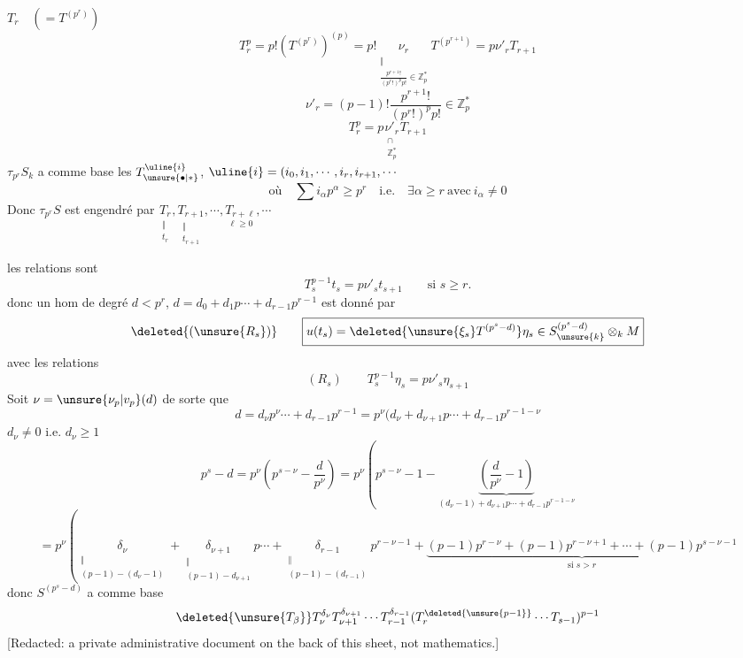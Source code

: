 $T_r\quad(=T^{(p^r)})$
\[
T_r^p=p!(T^{(p^r)})^{(p)}=p!\underset{\substack{\Vert\\\frac{p^{r+1}!}{(p^r!)^p p!}\in\mathbb Z_p^*}}{\nu_r}T^{(p^{r+1})}=p\nu'_rT_{r+1}
\]
\[
\nu'_r=(p-1)!\frac{p^{r+1}!}{(p^r!)^p p!}\in\mathbb Z_p^*
\]
\[
\boxed{T_r^p=p\underset{\substack{\cap\\\mathbb Z_p^*}}{\nu'_r}T_{r+1}}
\]
$\tau_{p^r}S_k$ a comme base les $T_{\unsure{\bullet|*}}^{\uline{i}}$, $\uline{i}=(i_0,i_1,\cdots,i_r,i_{r+1},\cdots$
\[
\text{où}\quad\sum i_\alpha p^\alpha\geq p^r\quad\text{i.e.}\quad\exists\alpha\geq r\ \text{avec}\ i_\alpha\ne0
\]
Donc $\tau_{p^r}S$ est engendré par $\underset{\substack{\Vert\\t_r}}{T_r},\underset{\substack{\Vert\\t_{r+1}}}{T_{r+1}},\cdots,\underset{\ell\geq0}{T_{r+\ell}},\cdots$

les relations sont
\[
\boxed{T_s^{p-1}t_s=p\nu'_s t_{s+1}\qquad\text{si }s\geq r}.
\]
donc un hom de degré $d<p^r$, $d=d_0+d_1p\cdots+d_{r-1}p^{r-1}$
est donné par 
\[
\deleted{(\unsure{R_s})}\qquad\boxed{u(t_s)=\deleted{\unsure{\xi_s}T^{(p^s-d)}}\eta_s\in S_{\unsure{k}}^{(p^s-d)}\otimes_k M}
\]
avec les relations
\[
(R_s)\qquad\boxed{T_s^{p-1}\eta_s=p\nu'_s\eta_{s+1}}
\]
Soit $\nu=\unsure{\nu_p|v_p}(d)$ de sorte que
\[
d=d_\nu p^\nu\cdots+d_{r-1}p^{r-1}=p^\nu(d_\nu+d_{\nu+1}p\cdots+d_{r-1}p^{r-1-\nu}
\]
$d_\nu\ne0$ i.e. $d_\nu\geq1$
\[
p^s-d=p^\nu\left(p^{s-\nu}-\frac d{p^\nu}\right)=p^\nu\left(p^{s-\nu}-1-\underbrace{\left(\frac d{p^\nu}-1\right)}_{(d_\nu-1)+d_{\nu+1}p\cdots+d_{r-1}p^{r-1-\nu}}\right.
\]
\[
=p^\nu\left(\underset{\substack{\Vert\\(p-1)-(d_\nu-1)}}{\delta_\nu}+\underset{\substack{\Vert\\(p-1)-d_{\nu+1}}}{\delta_{\nu+1}}p\cdots+\underset{\substack{\Vert\\(p-1)-(d_{r-1})}}{\delta_{r-1}}p^{r-\nu-1}+\underbrace{(p-1)p^{r-\nu}+(p-1)p^{r-\nu+1}+\cdots+(p-1)p^{s-\nu-1}}_{\text{si }s>r}\right.
\]
donc $S^{(p^s-d)}$ a comme base
\[
\deleted{\unsure{T_\beta}}T_\nu^{\delta_\nu}T_{\nu+1}^{\delta_{\nu+1}}\cdots T_{r-1}^{\delta_{r-1}}(T_r^{\deleted{\unsure{p-1}}}\cdots T_{s-1})^{p-1}
\]
[Redacted: a private administrative document on the back of this sheet, not mathematics.]


